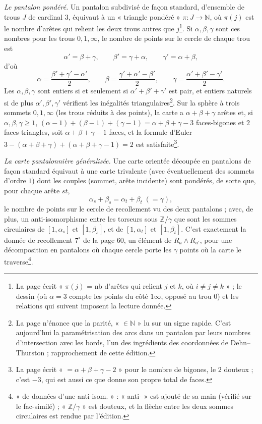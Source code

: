 \documentclass[11pt,a4paper]{article}
\begin{document}
\emph{Le pantalon pondéré.} Un pantalon subdivisé de façon standard, d'ensemble
de trous $J$ de cardinal $3$, équivaut à un « triangle pondéré » $\pi : J \to
\mathbb{N}$, où $\pi(j)$ est le nombre d'arêtes qui relient les deux trous autres
que $j$\footnote{La page écrit « $\pi(j)$ = nb d'arêtes qui relient $j$ et $k$,
où $i \neq j \neq k$ » ; le dessin (où $\alpha = 3$ compte les points du côté
$1\infty$, opposé au trou $0$) et les relations qui suivent imposent la
lecture donnée.}. Si $\alpha, \beta, \gamma$ sont ces nombres pour les trous
$0, 1, \infty$, le nombre de points sur le cercle de chaque trou est
\[
\alpha' = \beta + \gamma, \qquad \beta' = \gamma + \alpha, \qquad \gamma' =
\alpha + \beta,
\]
d'où
\[
\alpha = \frac{\beta' + \gamma' - \alpha'}{2}, \qquad \beta = \frac{\gamma' +
\alpha' - \beta'}{2}, \qquad \gamma = \frac{\alpha' + \beta' - \gamma'}{2}.
\]
Les $\alpha, \beta, \gamma$ sont entiers si et seulement si $\alpha' + \beta' +
\gamma'$ est pair, et entiers naturels si de plus $\alpha', \beta', \gamma'$
vérifient les inégalités triangulaires\footnote{La page n'énonce que la parité, «
$\in \mathbb{N}$ » lu sur un signe rapide. C'est aujourd'hui la paramétrisation
des arcs dans un pantalon par leurs nombres d'intersection avec les bords, l'un
des ingrédients des coordonnées de Dehn–Thurston ; rapprochement de cette
édition.}. Sur la sphère à trois sommets $0, 1, \infty$ (les trous réduits à des
points), la carte a $\alpha + \beta + \gamma$ arêtes et, si $\alpha, \beta,
\gamma \geq 1$, $(\alpha - 1) + (\beta - 1) + (\gamma - 1) = \alpha + \beta +
\gamma - 3$ faces-bigones et $2$ faces-triangles, soit $\alpha + \beta + \gamma
- 1$ faces, et la formule d'Euler $3 - (\alpha + \beta + \gamma) + (\alpha +
\beta + \gamma - 1) = 2$ est satisfaite\footnote{La page écrit « $= \alpha +
\beta + \gamma - 2$ » pour le nombre de bigones, le $2$ douteux ; c'est $-3$,
qui est aussi ce que donne son propre total de faces.}.

\emph{La carte pantalonnière généralisée.} Une carte orientée découpée en
pantalons de façon standard équivaut à une carte trivalente (avec
éventuellement des sommets d'ordre $1$) dont les couples (sommet, arête
incidente) sont pondérés, de sorte que, pour chaque arête $st$,
\[
\alpha_s + \beta_s = \alpha_t + \beta_t \;(= \gamma),
\]
le nombre de points sur le cercle de recollement vu des deux pantalons ; avec,
de plus, un anti-isomorphisme entre les torseurs sous $\mathbb{Z}/\gamma$ que sont
les sommes circulaires de $[1, \alpha_s]$ et $[1, \beta_s]$, et de $[1, \alpha_t]$
et $[1, \beta_t]$. C'est exactement la donnée de recollement $7^\circ$ de la
page 60, un élément de $R_a \wedge R_{a'}$, pour une décomposition en pantalons
où chaque cercle porte les $\gamma$ points où la carte le traverse\footnote{« de
données d'une anti-isom. » : « anti- » est ajouté de sa main (vérifié sur le fac-similé) ; « $\mathbb{Z}/\gamma$ » est
douteux, et la flèche entre les deux sommes circulaires est rendue par
l'édition.}.
\end{document}
